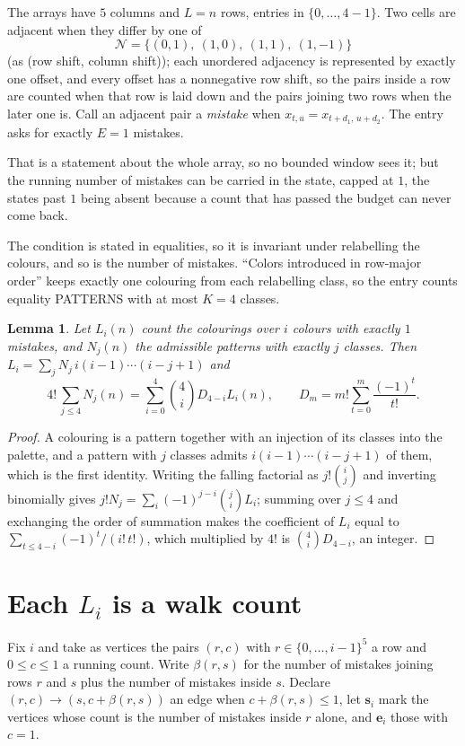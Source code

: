 \documentclass[11pt,a4paper]{article}
\theoremstyle{plain}
\newtheorem{lemma}[theorem]{Lemma}
\theoremstyle{definition}
\begin{document}
The arrays have $5$ columns and $L=n$ rows, entries in $\{0,\dots,4-1\}$.
Two cells are adjacent when they differ by one of
\[
\mathcal N=\{(0,1),\ (1,0),\ (1,1),\ (1,-1)\}
\]
(as (row shift, column shift)); each unordered adjacency is represented by exactly one
offset, and every offset has a nonnegative row shift, so the pairs inside a row are
counted when that row is laid down and the pairs joining two rows when the later one
is. Call an adjacent pair a \emph{mistake} when $x_{t,u}=x_{t+d_1,\,u+d_2}$. The entry asks for exactly
$E=1$ mistakes.

That is a statement about the whole array, so no bounded window sees it; but the running
number of mistakes can be carried in the state, capped at $1$, the states past $1$ being
absent because a count that has passed the budget can never come back.

The condition is stated in equalities, so it is invariant under relabelling the colours, and
so is the number of mistakes. ``Colors introduced in row-major order'' keeps exactly one
colouring from each relabelling class, so the entry counts equality PATTERNS with at most
$K=4$ classes.

\begin{lemma}\label{lem:inv}
Let $L_i(n)$ count the colourings over $i$ colours with exactly $1$ mistakes, and $N_j(n)$
the admissible patterns with exactly $j$ classes. Then
$L_i=\sum_j N_j\,i(i-1)\cdots(i-j+1)$ and
\[
4!\,\sum_{j\le4}N_j(n)=\sum_{i=0}^{4}\binom{4}{i}D_{4-i}L_i(n),
\qquad D_m=m!\sum_{t=0}^{m}\frac{(-1)^t}{t!} .
\]
\end{lemma}

\begin{proof}
A colouring is a pattern together with an injection of its classes into the palette, and a
pattern with $j$ classes admits $i(i-1)\cdots(i-j+1)$ of them, which is the first identity.
Writing the falling factorial as $j!\binom{i}{j}$ and inverting binomially gives
$j!N_j=\sum_i(-1)^{j-i}\binom{j}{i}L_i$; summing over $j\le4$ and exchanging the order
of summation makes the coefficient of $L_i$ equal to $\sum_{t\le4-i}(-1)^t/(i!\,t!)$,
which multiplied by $4!$ is $\binom{4}{i}D_{4-i}$, an integer.
\end{proof}

\section{Each $L_i$ is a walk count}

Fix $i$ and take as vertices the pairs $(r,c)$ with $r\in\{0,\dots,i-1\}^{5}$ a row
and $0\le c\le1$ a running count. Write $\beta(r,s)$ for the number of mistakes joining
rows $r$ and $s$ plus the number of mistakes inside $s$. Declare $(r,c)\to(s,c+\beta(r,s))$
an edge when $c+\beta(r,s)\le1$, let $\mathbf{s}_i$ mark the vertices whose count is the
number of mistakes inside $r$ alone, and $\mathbf{e}_i$ those with $c=1$.
\end{document}
